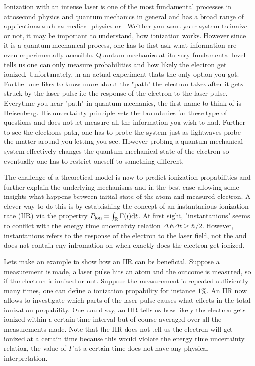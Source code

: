 Ionization with an intense laser is one of the most fundamental processes in attosecond physics and quantum mechanics in general and has a broad range of applications such as medical physics or .
Weither you want your system to ionize or not, it may be important to understand, how ionization works.
However since it is a quantum mechanical process, one has to first ask what information are even experimentally acessible.
Quantum mechanics at its very fundamental level tells us one can only measure probabilities and how likely the electron get ionized.
Unfortunately, in an actual experiment thats the only option you got.
Further one likes to know more about the "path" the electron takes after it gets struck by the laser pulse i.e the response of the electron to the laser pulse.
Everytime you hear "path" in quantum mechanics, the first name to think of is Heisenberg.
His uncertainty principle sets the boundaries for these type of questions and does not let measure all the information you wish to had.
Further to see the electrons path, one has to probe the system just as lightwaves probe the matter around you letting you see.
However probing a quantum mechanical system effectively changes the quantum mechanical state of the electron so eventually one has to restrict oneself to something different.

The challenge of a theoretical model is now to predict ionization propabilities and further explain the underlying mechanisms and in the best case allowing some insights what happens between initial state of the atom and measured electron.
A clever way to do this is by establishing the concept of an instantanious ionization rate (IIR) via the propertry $P_{\mathrm{ion}}=\int_{\mathbb{R}}\Gamma (t)\mathrm{d} t$.
At first sight, "instantanious" seems to conflict with the energy time uncertainty relation $\Delta E \Delta t \geq \hbar/2$.
However, instantanious refers to the response of the electron to the laser field, not the and does not contain eny infromation on when exactly does the electron get ionized.

Lets make an example to show how an IIR can be beneficial.
Suppose a measurement is made, a laser pulse hits an atom and the outcome is measured, so if the electron is ionized or not.
Suppose the measurement is repeated sufficiently many times, one can define a ionization propability for instance $1\%$.
An IIR now allows to investigate which parts of the laser pulse causes what effects in the total ionization propability.
One could say, an IIR tells us how likely the electron gets ionized within a certain time interval but of course averaged over all the measurements made.
Note that the IIR does not tell us the electron will get ionized at a certain time because this would violate the energy time uncertainty relation, the value of $\Gamma$ at a certain time does not have any physical interpretation.

